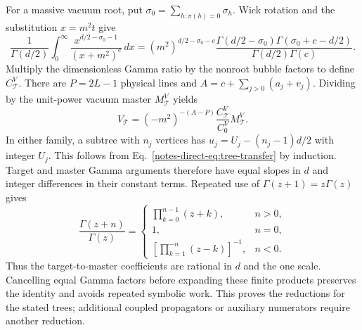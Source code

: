 \documentclass[11pt,a4paper]{article}
\begin{document}
For a massive vacuum root, put $\sigma_0=\sum_{h:\pi(h)=0}\sigma_h$. Wick rotation and the substitution $x=m^2t$ give
\begin{equation}
 \frac{1}{\Gamma(d/2)}\int_0^\infty
 \frac{x^{d/2-\sigma_0-1}}{(x+m^2)^c}\,dx
 =(m^2)^{d/2-\sigma_0-c}
 \frac{\Gamma(d/2-\sigma_0)\Gamma(\sigma_0+c-d/2)}
 {\Gamma(d/2)\Gamma(c)}.
 \label{notes-direct-eq:tree-vacuum}
\end{equation}
Multiply the dimensionless Gamma ratio by the nonroot bubble factors to define $C_{\mathcal T}^{V}$. There are $P=2L-1$ physical lines and $A=c+\sum_{j>0}(a_j+v_j)$. Dividing by the unit-power vacuum master $M_{\mathcal T}^{V}$ yields
\begin{equation}
 V_{\mathcal T}=(-m^2)^{-(A-P)}
 \frac{C_{\mathcal T}^{V}}{C_0^{V}}M_{\mathcal T}^{V}.
 \label{notes-direct-eq:tree-vacuum-ratio}
\end{equation}
In either family, a subtree with $n_j$ vertices has $u_j=U_j-(n_j-1)d/2$ with integer $U_j$. This follows from Eq.~\eqref{notes-direct-eq:tree-transfer} by induction. Target and master Gamma arguments therefore have equal slopes in $d$ and integer differences in their constant terms. Repeated use of $\Gamma(z+1)=z\Gamma(z)$ gives
\begin{equation}
 \frac{\Gamma(z+n)}{\Gamma(z)}=
 \begin{cases}\prod_{k=0}^{n-1}(z+k),&n>0,\\
 1,&n=0,\\
 [\prod_{k=1}^{-n}(z-k)]^{-1},&n<0.
 \end{cases}
 \label{notes-direct-eq:tree-gamma-ratio}
\end{equation}
Thus the target-to-master coefficients are rational in $d$ and the one scale. Cancelling equal Gamma factors before expanding these finite products preserves the identity and avoids repeated symbolic work. This proves the reductions for the stated trees; additional coupled propagators or auxiliary numerators require another reduction.
\end{document}
